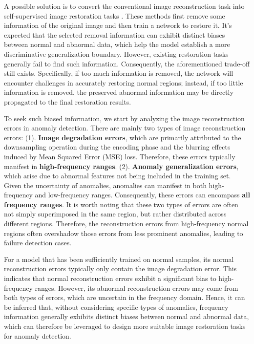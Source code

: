 \documentclass[5p, twocolumn]{elsarticle}[draft]
\begin{document}
A possible solution is to convert the conventional image reconstruction task into self-supervised image restoration tasks \cite{ye2020attribute,zavrtanik2021reconstruction,pirnay2022inpainting,huang2019inverse}. These methods first remove some information of the original image and then train a network to restore it. It's expected that the selected removal information can exhibit distinct biases between normal and abnormal data, which help the model establish a more discriminative generalization boundary. However, existing restoration tasks generally fail to find such information. Consequently, the aforementioned trade-off still exists. Specifically, if too much information is removed, the network will encounter challenges in accurately restoring normal regions; instead, if too little information is removed, the preserved abnormal information may be directly propagated to the final restoration results.

To seek such biased information, we start by analyzing the image reconstruction errors in anomaly detection. There are mainly two types of image reconstruction errors: (1). \textbf{Image degradation errors}, which are primarily attributed to the downsampling operation during the encoding phase and the blurring effects induced by Mean Squared Error (MSE) loss. Therefore, these errors typically manifest in \textbf{high-frequency ranges}. (2). \textbf{Anomaly generalization errors}, which arise due to abnormal features not being included in the training set. Given the uncertainty of anomalies, anomalies can manifest in both high-frequency and low-frequency ranges. Consequently, these errors can encompass \textbf{all frequency ranges}. It is worth noting that these two types of errors are often not simply superimposed in the same region, but rather distributed across different regions. Therefore, the reconstruction errors from high-frequency normal regions often overshadow those errors from less prominent anomalies, leading to failure detection cases.

For a model that has been sufficiently trained on normal samples, its normal reconstruction errors typically only contain the image degradation error. This indicates that normal reconstruction errors exhibit a significant bias to high-frequency ranges. However, its abnormal reconstruction errors may come from both types of errors, which are uncertain in the frequency domain. Hence, it can be inferred that, without considering specific types of anomalies, frequency information generally exhibits distinct biases between normal and abnormal data, which can therefore be leveraged to design more suitable image restoration tasks for anomaly detection.
\end{document}
